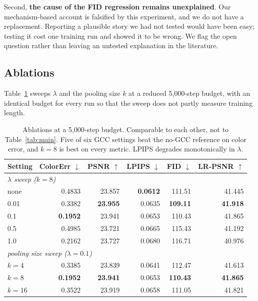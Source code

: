 \documentclass[11pt]{article}
\newcommand{\best}[1]{\textbf{#1}}
\begin{document}
Second, \textbf{the cause of the FID regression remains unexplained}. Our
mechanism-based account is falsified by this experiment, and we do not have a
replacement. Reporting a plausible story we had not tested would have been easy;
testing it cost one training run and showed it to be wrong. We flag the open
question rather than leaving an untested explanation in the literature.

\subsection{Ablations}

Table~\ref{tab:abl} sweeps $\lambda$ and the pooling size $k$ at a reduced
5{,}000-step budget, with an identical budget for every run so that the sweep
does not partly measure training length.

\begin{table}[t]
\centering
\small
\begin{tabular}{lrrrrr}
\toprule
Setting & ColorErr $\downarrow$ & PSNR $\uparrow$ & LPIPS $\downarrow$ & FID $\downarrow$ & LR-PSNR $\uparrow$ \\
\midrule
\multicolumn{6}{l}{\emph{$\lambda$ sweep ($k=8$)}}\\
none        & 0.4833 & 23.857 & \best{0.0612} & 111.51 & 41.445 \\
0.01        & 0.3382 & \best{23.955} & 0.0635 & \best{109.11} & \best{41.918} \\
0.1         & \best{0.1952} & 23.941 & 0.0653 & 110.43 & 41.865 \\
0.5         & 0.4985 & 23.721 & 0.0665 & 115.43 & 41.192 \\
1.0         & 0.2162 & 23.727 & 0.0680 & 116.71 & 40.976 \\
\midrule
\multicolumn{6}{l}{\emph{pooling size sweep ($\lambda=0.1$)}}\\
$k=4$       & 0.3385 & 23.839 & 0.0641 & 112.47 & 41.613 \\
$k=8$       & \best{0.1952} & \best{23.941} & 0.0653 & \best{110.43} & \best{41.865} \\
$k=16$      & 0.3522 & 23.919 & 0.0658 & 111.05 & 41.821 \\
\bottomrule
\end{tabular}
\caption{Ablations at a 5{,}000-step budget. Comparable to each other, not to
Table~\ref{tab:main}. Five of six GCC settings beat the no-GCC reference on color
error, and $k=8$ is best on every metric. LPIPS degrades monotonically in
$\lambda$.}
\label{tab:abl}
\end{table}
\end{document}
